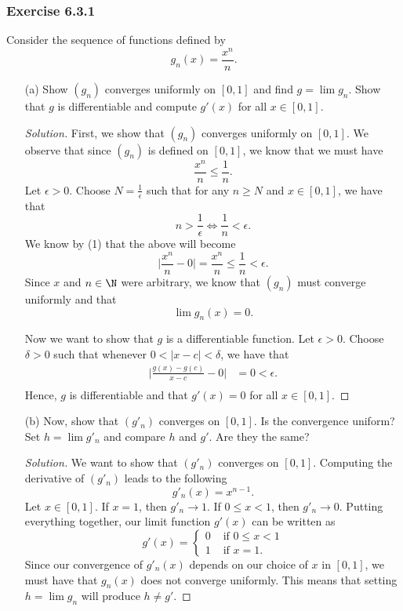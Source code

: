 \subsubsection{Exercise 6.3.1} Consider the sequence of functions defined by
\[  g_n(x) = \frac{ x^n  }{ n  }. \]
\begin{enumerate}
    \item[(a)] Show \( (g_n)  \) converges uniformly on \( [0,1]  \) and find \( g = \lim g_n  \). Show that \( g  \) is differentiable and compute \( g'(x)  \) for all \( x \in [0,1]  \).
        \begin{proof}[Solution]
            First, we show that \( (g_n)  \) converges uniformly on \( [0,1] \). We observe that since \( (g_n)  \) is defined on \( [0,1]  \), we know that we must have
            \[  \frac{ x^n  }{ n  } \leq \frac{ 1 }{ n }. \tag{1} \]
            Let \( \epsilon > 0  \). Choose \( N = \frac{ 1 }{ \epsilon  }  \) such that for any \( n \geq N  \) and \( x \in [0,1] \), we have that 
            \[ n > \frac{ 1 }{ \epsilon  } \iff \frac{ 1 }{ n } < \epsilon. \]
            We know by (1) that the above will become
            \[   \Big| \frac{ x^n }{ n } - 0  \Big|   = \frac{ x^n  }{ n } \leq \frac{ 1 }{ n } < \epsilon.  \]
            Since \( x  \) and \( n \in \N  \) were arbitrary, we know that \( (g_n)  \) must converge uniformly and that 
            \[  \lim g_n(x) = 0. \]
           
        Now we want to show that \( g  \) is a differentiable function. Let \( \epsilon > 0  \). Choose \( \delta > 0  \) such that whenever \( 0 < | x - c  | < \delta \), we have that 
        \begin{align*}
            \Big| \frac{ g(x) - g(c)  }{ x -c  } - 0  \Big| &= 0 < \epsilon. \\
        \end{align*}
        Hence, \( g  \) is differentiable and that \( g'(x) = 0  \) for all \( x \in [0,1] \).
        \end{proof}
    \item[(b)] Now, show that \( (g'_n) \) converges on \( [0,1]  \). Is the convergence uniform? Set \( h = \lim g'_n  \) and compare \( h  \) and \( g'  \). Are they the same?
        \begin{proof}[Solution]
            We want to show that \( (g'_n) \) converges on \( [0,1] \). Computing the derivative of \( (g'_n) \) leads to the following
            \[  g'_n(x) = x^{n-1}. \]
            Let \( x \in [0,1] \). If \( x = 1  \), then \( g'_n \to 1  \). If \( 0 \leq x < 1  \), then \( g'_n \to 0  \). Putting everything together, our limit function \( g'(x)  \) can be written as 
            \[ g'(x) = 
            \begin{cases}
                0 &\text{ if } 0 \leq x < 1 \\
                1 &\text{ if } x = 1.
            \end{cases}  \]
            Since our convergence of \( g'_n(x)  \) depends on our choice of \( x  \) in \( [0,1] \), we must have that \( g_n(x)  \) does not converge uniformly.
            This means that setting \( h = \lim g_n  \) will produce \( h \neq g' \).
        \end{proof}


\end{enumerate}
